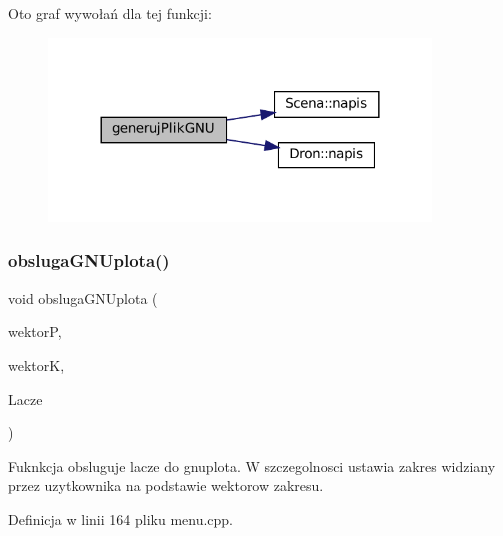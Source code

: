 Oto graf wywołań dla tej funkcji\+:\nopagebreak
\begin{figure}[H]
\begin{center}
\leavevmode
\includegraphics[width=288pt]{menu_8hh_a924b8ff013a18f0f1f0fdbdda6538e07_cgraph}
\end{center}
\end{figure}
\mbox{\label{menu_8hh_a233cd71579a56ad0b2926d4c5217eaa1}} 
\subsubsection{\texorpdfstring{obslugaGNUplota()}{obslugaGNUplota()}}
{\footnotesize\ttfamily void obsluga\+G\+N\+Uplota (\begin{DoxyParamCaption}\item[{const \mbox{\hyperlink{class_wektor3_d}{Wektor3D}} \&}]{wektorP,  }\item[{const \mbox{\hyperlink{class_wektor3_d}{Wektor3D}} \&}]{wektorK,  }\item[{\mbox{\hyperlink{class_pz_g_1_1_lacze_do_g_n_u_plota}{Pz\+G\+::\+Lacze\+Do\+G\+N\+U\+Plota}}}]{Lacze }\end{DoxyParamCaption})}

Fuknkcja obsluguje lacze do gnuplota. W szczegolnosci ustawia zakres widziany przez uzytkownika na podstawie wektorow zakresu. 

Definicja w linii 164 pliku menu.\+cpp.

